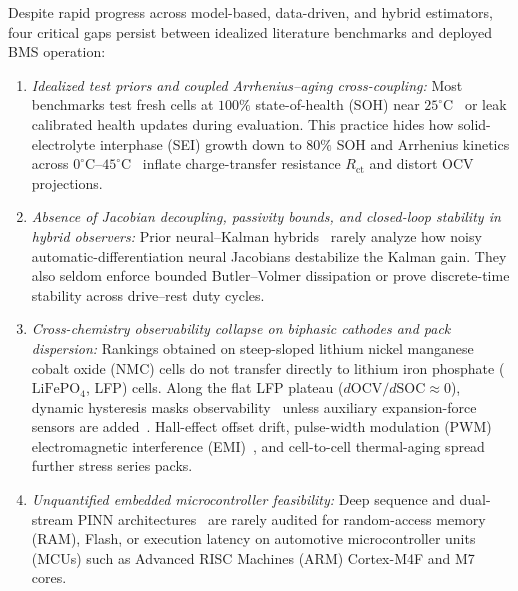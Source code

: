 \documentclass[10pt,a4paper]{article}
\begin{document}
Despite rapid progress across model-based, data-driven, and hybrid estimators, four critical gaps persist between idealized literature benchmarks and deployed BMS operation:
\begin{enumerate}
\item \emph{Idealized test priors and coupled Arrhenius--aging cross-coupling:} Most benchmarks test fresh cells at $100\%$ state-of-health (SOH) near $25^\circ\text{C}$~\cite{Hu2012ecm,Chemali2018dnn,Le2026charging} or leak calibrated health updates during evaluation. This practice hides how solid-electrolyte interphase (SEI) growth down to $80\%$ SOH and Arrhenius kinetics across $0^\circ\text{C}\text{--}45^\circ\text{C}$~\cite{He2011ecm,Ren2019aging} inflate charge-transfer resistance $R_{\text{ct}}$ and distort OCV projections.
\item \emph{Absence of Jacobian decoupling, passivity bounds, and closed-loop stability in hybrid observers:} Prior neural--Kalman hybrids~\cite{Charkhgard2010dekf,Tu2023hybrid,Wang2024aekf_lstm,Shen2025kf,Yu2025lstm_ekf} rarely analyze how noisy automatic-differentiation neural Jacobians destabilize the Kalman gain. They also seldom enforce bounded Butler--Volmer dissipation or prove discrete-time stability across drive--rest duty cycles.
\item \emph{Cross-chemistry observability collapse on biphasic cathodes and pack dispersion:} Rankings obtained on steep-sloped lithium nickel manganese cobalt oxide (NMC) cells do not transfer directly to lithium iron phosphate ($\text{LiFePO}_4$, LFP) cells. Along the flat LFP plateau ($d\text{OCV}/d\text{SOC} \approx 0$), dynamic hysteresis masks observability~\cite{Roscher2011hysteresis,Verbrugge2004hysteresis,Marongiu2016hyst} unless auxiliary expansion-force sensors are added~\cite{Tian2025}. Hall-effect offset drift, pulse-width modulation (PWM) electromagnetic interference (EMI)~\cite{Hashemi2020}, and cell-to-cell thermal-aging spread~\cite{Yang2024degradation,Zheng2018inconsistency} further stress series packs.
\item \emph{Unquantified embedded microcontroller feasibility:} Deep sequence and dual-stream PINN architectures~\cite{Song2019bilstm,Bhattacharya2024gpr,Zhou2025dualstream_jes} are rarely audited for random-access memory (RAM), Flash, or execution latency on automotive microcontroller units (MCUs) such as Advanced RISC Machines (ARM) Cortex-M4F and M7 cores.
\end{enumerate}
\end{document}
